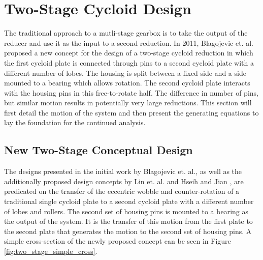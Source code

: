 \section{Two-Stage Cycloid Design} \label{ch:dual:initial_equations}

The traditional approach to a mutli-stage gearbox is to take the output of the reducer and use it as the input to a second reduction. In 2011, Blagojevic et. al. \cite{ref:new_two_stage} proposed a new concept for the design of a two-stage cycloid reduction in which  the first cycloid plate is connected through pins to a second cycloid plate with a different number of lobes. The housing is split between a fixed side and a side mounted to a bearing which allows rotation. The second cycloid plate interacts with the housing pins in this free-to-rotate half. The difference in number of pins, but similar motion results in potentially very large reductions. This section will first detail the motion of the system and then present the generating equations to lay the foundation for the continued analysis. 

\subsection{New Two-Stage Conceptual Design} \label{ch:dual:initial_equation:motion}

The designs presented in the initial work by Blagojevic et. al., as well as the additionally proposed design concepts by Lin et. al. \cite{ref:two_stage_tooth_mod} and Hseih and Jian \cite{ref:hsieh_effect_2016}, are predicated on the transfer of the eccentric wobble and counter-rotation of a traditional single cycloid plate to a second cycloid plate with a different number of lobes and rollers. The second set of housing pins is mounted to a bearing as the output of the system. It is the transfer of this motion from the first plate to the second plate that generates the motion to the second set of housing pins. A simple cross-section of the newly proposed concept can be seen in Figure \ref{fig:two_stage_simple_cross}. 

